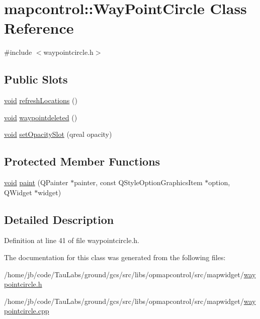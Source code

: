 \hypertarget{classmapcontrol_1_1_way_point_circle}{\section{mapcontrol\-:\-:\-Way\-Point\-Circle \-Class \-Reference}
\label{classmapcontrol_1_1_way_point_circle}
}


{\ttfamily \#include $<$waypointcircle.\-h$>$}

\subsection*{\-Public \-Slots}
\begin{DoxyCompactItemize}
\item 
\hyperlink{group___u_a_v_objects_plugin_ga444cf2ff3f0ecbe028adce838d373f5c}{void} \hyperlink{group___o_p_map_widget_ga56684f440455598d530b5952c5b0d640}{refresh\-Locations} ()
\item 
\hyperlink{group___u_a_v_objects_plugin_ga444cf2ff3f0ecbe028adce838d373f5c}{void} \hyperlink{group___o_p_map_widget_ga25a712ca0ed34f0163763e1244f9cee8}{waypointdeleted} ()
\item 
\hyperlink{group___u_a_v_objects_plugin_ga444cf2ff3f0ecbe028adce838d373f5c}{void} \hyperlink{group___o_p_map_widget_ga4dcdc126c105f68278a330efd6e8e590}{set\-Opacity\-Slot} (qreal opacity)
\end{DoxyCompactItemize}
\subsection*{\-Protected \-Member \-Functions}
\begin{DoxyCompactItemize}
\item 
\hyperlink{group___u_a_v_objects_plugin_ga444cf2ff3f0ecbe028adce838d373f5c}{void} \hyperlink{group___o_p_map_widget_ga90e225e45f660d413d4d7ecac9bda3d9}{paint} (\-Q\-Painter $\ast$painter, const \-Q\-Style\-Option\-Graphics\-Item $\ast$option, \-Q\-Widget $\ast$widget)
\end{DoxyCompactItemize}


\subsection{\-Detailed \-Description}


\-Definition at line 41 of file waypointcircle.\-h.



\-The documentation for this class was generated from the following files\-:\begin{DoxyCompactItemize}
\item 
/home/jb/code/\-Tau\-Labs/ground/gcs/src/libs/opmapcontrol/src/mapwidget/\hyperlink{waypointcircle_8h}{waypointcircle.\-h}\item 
/home/jb/code/\-Tau\-Labs/ground/gcs/src/libs/opmapcontrol/src/mapwidget/\hyperlink{waypointcircle_8cpp}{waypointcircle.\-cpp}\end{DoxyCompactItemize}
